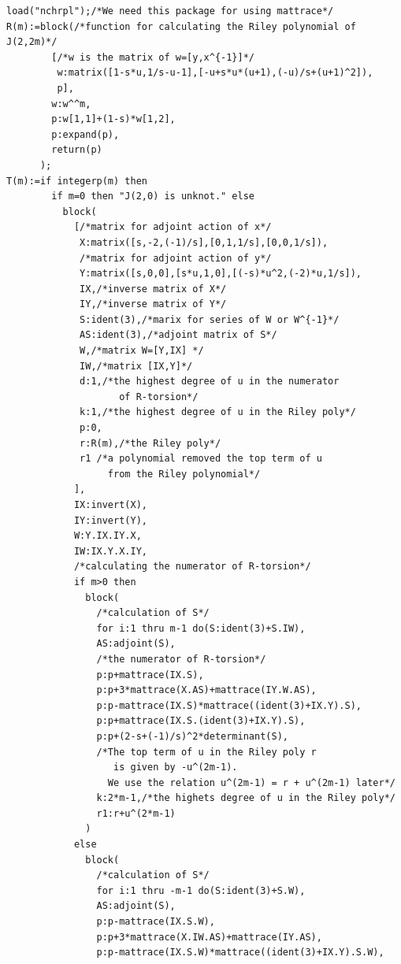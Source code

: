 \documentclass[a4paper]{amsart}
\theoremstyle{plain}
\theoremstyle{definition}
\theoremstyle{remark}
\begin{document}
\begin{small}
\begin{verbatim}
load("nchrpl");/*We need this package for using mattrace*/
R(m):=block(/*function for calculating the Riley polynomial of J(2,2m)*/ 
        [/*w is the matrix of w=[y,x^{-1}]*/
         w:matrix([1-s*u,1/s-u-1],[-u+s*u*(u+1),(-u)/s+(u+1)^2]), 
         p],
        w:w^^m,
        p:w[1,1]+(1-s)*w[1,2],
        p:expand(p),
        return(p)
      );
T(m):=if integerp(m) then 
        if m=0 then "J(2,0) is unknot." else 
          block(
            [/*matrix for adjoint action of x*/
             X:matrix([s,-2,(-1)/s],[0,1,1/s],[0,0,1/s]),
             /*matrix for adjoint action of y*/
             Y:matrix([s,0,0],[s*u,1,0],[(-s)*u^2,(-2)*u,1/s]),
             IX,/*inverse matrix of X*/
             IY,/*inverse matrix of Y*/
             S:ident(3),/*marix for series of W or W^{-1}*/
             AS:ident(3),/*adjoint matrix of S*/
             W,/*matrix W=[Y,IX] */
             IW,/*matrix [IX,Y]*/
             d:1,/*the highest degree of u in the numerator 
                    of R-torsion*/
             k:1,/*the highest degree of u in the Riley poly*/
             p:0,
             r:R(m),/*the Riley poly*/
             r1 /*a polynomial removed the top term of u 
                  from the Riley polynomial*/
            ],
            IX:invert(X),
            IY:invert(Y),
            W:Y.IX.IY.X,
            IW:IX.Y.X.IY,
            /*calculating the numerator of R-torsion*/
            if m>0 then 
              block(
                /*calculation of S*/
                for i:1 thru m-1 do(S:ident(3)+S.IW),
                AS:adjoint(S),
                /*the numerator of R-torsion*/
                p:p+mattrace(IX.S),
                p:p+3*mattrace(X.AS)+mattrace(IY.W.AS),
                p:p-mattrace(IX.S)*mattrace((ident(3)+IX.Y).S),
                p:p+mattrace(IX.S.(ident(3)+IX.Y).S),
                p:p+(2-s+(-1)/s)^2*determinant(S),
                /*The top term of u in the Riley poly r
                   is given by -u^(2m-1).
                  We use the relation u^(2m-1) = r + u^(2m-1) later*/
                k:2*m-1,/*the highets degree of u in the Riley poly*/
                r1:r+u^(2*m-1)
              )
            else 
              block(
                /*calculation of S*/
                for i:1 thru -m-1 do(S:ident(3)+S.W),
                AS:adjoint(S),
                p:p-mattrace(IX.S.W),
                p:p+3*mattrace(X.IW.AS)+mattrace(IY.AS),
                p:p-mattrace(IX.S.W)*mattrace((ident(3)+IX.Y).S.W),

\end{verbatim}
\end{small}
\end{document}
